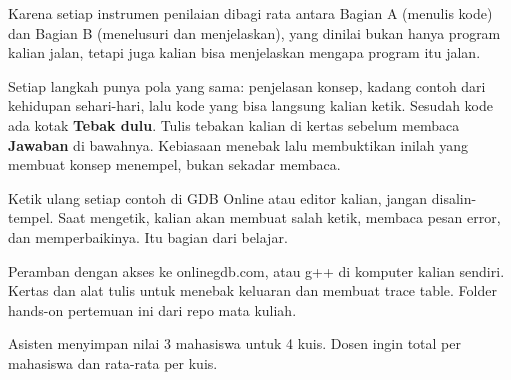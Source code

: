 \documentclass[a4paper]{article}
\begin{document}
\par\vspace{4pt}\par\vspace{6pt}
Karena setiap instrumen penilaian dibagi rata antara Bagian A (menulis kode) dan Bagian B (menelusuri dan menjelaskan), yang dinilai bukan hanya program kalian jalan, tetapi juga kalian bisa menjelaskan mengapa program itu jalan.

Setiap langkah punya pola yang sama: penjelasan konsep, kadang contoh dari kehidupan sehari-hari, lalu kode yang bisa langsung kalian ketik. Sesudah kode ada kotak \textbf{Tebak dulu}. Tulis tebakan kalian di kertas sebelum membaca \textbf{Jawaban} di bawahnya. Kebiasaan menebak lalu membuktikan inilah yang membuat konsep menempel, bukan sekadar membaca.

\begin{Penting}
Ketik ulang setiap contoh di GDB Online atau editor kalian, jangan disalin-tempel. Saat mengetik, kalian akan membuat salah ketik, membaca pesan error, dan memperbaikinya. Itu bagian dari belajar.
\end{Penting}
Peramban dengan akses ke onlinegdb.com, atau g++ di komputer kalian sendiri. Kertas dan alat tulis untuk menebak keluaran dan membuat trace table. Folder hands-on pertemuan ini dari repo mata kuliah.

Asisten menyimpan nilai 3 mahasiswa untuk 4 kuis. Dosen ingin total per mahasiswa dan rata-rata per kuis.
\end{document}
